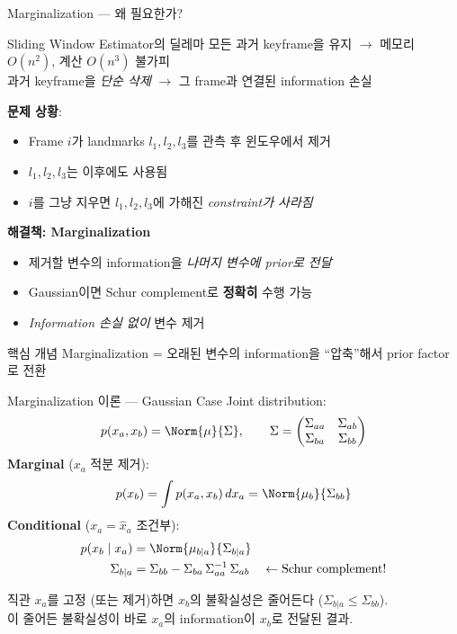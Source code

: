
\begin{frame}{Marginalization — 왜 필요한가?}
  \begin{block}{Sliding Window Estimator의 딜레마}
    모든 과거 keyframe을 유지 $\to$ 메모리 $O(n^2)$, 계산 $O(n^3)$ 불가피\\
    과거 keyframe을 \emph{단순 삭제} $\to$ 그 frame과 연결된 information 손실
  \end{block}
  \pause
  \textbf{문제 상황}:
  \begin{itemize}
    \item Frame $i$가 landmarks $l_1, l_2, l_3$를 관측 후 윈도우에서 제거
    \item $l_1, l_2, l_3$는 이후에도 사용됨
    \item $i$를 그냥 지우면 $l_1, l_2, l_3$에 가해진 \emph{constraint가 사라짐}
  \end{itemize}
  \pause
  \textbf{해결책: Marginalization}
  \begin{itemize}
    \item 제거할 변수의 information을 \emph{나머지 변수에 prior로 전달}
    \item Gaussian이면 Schur complement로 \textbf{정확히} 수행 가능
    \item \emph{Information 손실 없이} 변수 제거
  \end{itemize}
  \pause
  \begin{alertblock}{핵심 개념}
    Marginalization = 오래된 변수의 information을 ``압축''해서 prior factor로 전환
  \end{alertblock}
\end{frame}

\begin{frame}[shrink=20]{Marginalization 이론 — Gaussian Case}
  Joint distribution:
  \[
    p(x_a, x_b) = \Norm{\mu}{\Sigma},
    \qquad
    \Sigma = \begin{pmatrix}\Sigma_{aa} & \Sigma_{ab} \\ \Sigma_{ba} & \Sigma_{bb}\end{pmatrix}
  \]
  \pause
  \textbf{Marginal} ($x_a$ 적분 제거):
  \[
    p(x_b) = \int p(x_a, x_b)\,dx_a = \Norm{\mu_b}{\Sigma_{bb}}
  \]
  \pause
  \textbf{Conditional} ($x_a = \hat{x}_a$ 조건부):
  \begin{align*}
    p(x_b \mid x_a) &= \Norm{\mu_{b|a}}{\Sigma_{b|a}} \\
    \Sigma_{b|a} &= \Sigma_{bb} - \Sigma_{ba}\,\Sigma_{aa}^{-1}\,\Sigma_{ab}
    \quad \leftarrow \text{Schur complement!}
  \end{align*}
  \pause
  \begin{exampleblock}{직관}
    $x_a$를 고정 (또는 제거)하면 $x_b$의 불확실성은 줄어든다 ($\Sigma_{b|a} \le \Sigma_{bb}$).\\
    이 줄어든 불확실성이 바로 $x_a$의 information이 $x_b$로 전달된 결과.
  \end{exampleblock}
\end{frame}

